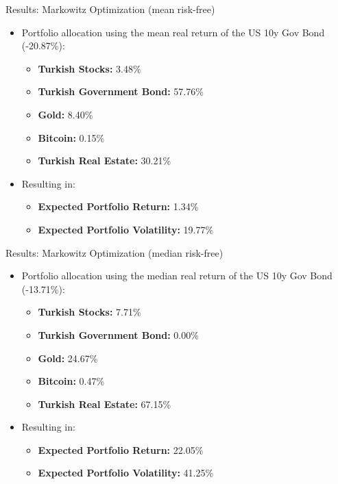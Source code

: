 \documentclass{beamer}
\begin{document}
\begin{frame}{Results: Markowitz Optimization (mean risk-free)}
\begin{itemize}
    \item Portfolio allocation using the mean real return of the US 10y Gov Bond (-20.87\%):
    \begin{itemize}
        \item \textbf{Turkish Stocks:} 3.48\%
        \item \textbf{Turkish Government Bond:} 57.76\%
        \item \textbf{Gold:} 8.40\%
        \item \textbf{Bitcoin:} 0.15\%
        \item \textbf{Turkish Real Estate:} 30.21\%
    \end{itemize}
    \item Resulting in:
    \begin{itemize}
        \item \textbf{Expected Portfolio Return:} 1.34\%
        \item \textbf{Expected Portfolio Volatility:} 19.77\%
    \end{itemize}
\end{itemize}
\end{frame}

\begin{frame}{Results: Markowitz Optimization (median risk-free)}
\begin{itemize}
    \item Portfolio allocation using the median real return of the US 10y Gov Bond (-13.71\%):
    \begin{itemize}
        \item \textbf{Turkish Stocks:} 7.71\%
        \item \textbf{Turkish Government Bond:} 0.00\%
        \item \textbf{Gold:} 24.67\%
        \item \textbf{Bitcoin:} 0.47\%
        \item \textbf{Turkish Real Estate:} 67.15\%
    \end{itemize}
    \item Resulting in:
    \begin{itemize}
        \item \textbf{Expected Portfolio Return:} 22.05\%
        \item \textbf{Expected Portfolio Volatility:} 41.25\%
    \end{itemize}
\end{itemize}
\end{frame}
\end{document}
